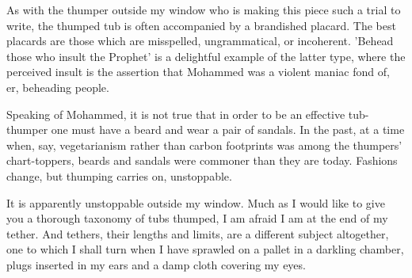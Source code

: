 As with the thumper outside my window who is making this piece such a trial to write, the thumped tub is often accompanied by a brandished placard. The best placards are those which are misspelled, ungrammatical, or incoherent. 'Behead those who insult the Prophet' is a delightful example of the latter type, where the perceived insult is the assertion that Mohammed was a violent maniac fond of, er, beheading people.

Speaking of Mohammed, it is not true that in order to be an effective tub-thumper one must have a beard and wear a pair of sandals. In the past, at a time when, say, vegetarianism rather than carbon footprints was among the thumpers' chart-toppers, beards and sandals were commoner than they are today. Fashions change, but thumping carries on, unstoppable.

It is apparently unstoppable outside my window. Much as I would like to give you a thorough taxonomy of tubs thumped, I am afraid I am at the end of my tether. And tethers, their lengths and limits, are a different subject altogether, one to which I shall turn when I have sprawled on a pallet in a darkling chamber, plugs inserted in my ears and a damp cloth covering my eyes.